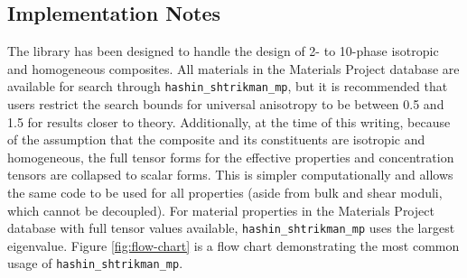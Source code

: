 \documentclass[letterpaper,12pt]{formatfile}
\begin{document}
\subsection{Implementation Notes} \label{subsec:implementation}
The library has been designed to handle the design of 2- to 10-phase isotropic and homogeneous composites. All materials in the Materials Project database are available for search through \verb|hashin_shtrikman_mp|, but it is recommended that users restrict the search bounds for universal anisotropy to be between 0.5 and 1.5 for results closer to theory. Additionally, at the time of this writing, because of the assumption that the composite and its constituents are isotropic and homogeneous, the full tensor forms for the effective properties and concentration tensors are collapsed to scalar forms. This is simpler computationally and allows the same code to be used for all properties (aside from bulk and shear moduli, which cannot be decoupled). For material properties in the Materials Project database with full tensor values available, \verb|hashin_shtrikman_mp| uses the largest eigenvalue. Figure \ref{fig:flow-chart} is a flow chart demonstrating the most common usage of \verb|hashin_shtrikman_mp|.
\end{document}
